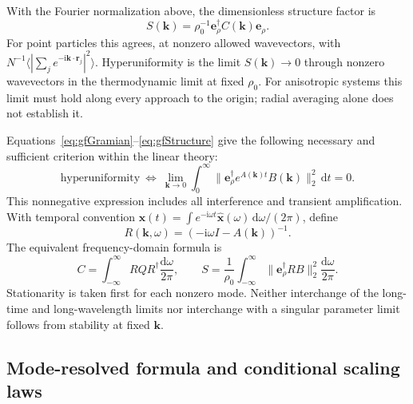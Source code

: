 \documentclass{article}
\begin{document}
With the Fourier normalization above, the dimensionless structure factor is
\begin{equation}
    \boxed{S(\mathbf k)=\rho_0^{-1}\mathbf e_\rho^\dagger C(\mathbf k)\mathbf e_\rho.}
    \label{eq:gfStructure}
\end{equation}
For point particles this agrees, at nonzero allowed wavevectors, with $N^{-1}\langle|\sum_j e^{-\mathrm i\mathbf k\cdot\mathbf r_j}|^2\rangle$. Hyperuniformity is the limit $S(\mathbf k)\to0$ through nonzero wavevectors in the thermodynamic limit at fixed $\rho_0$. For anisotropic systems this limit must hold along every approach to the origin; radial averaging alone does not establish it.

Equations~\eqref{eq:gfGramian}--\eqref{eq:gfStructure} give the following necessary and sufficient criterion within the linear theory:
\begin{equation}
    \boxed{\text{hyperuniformity}\ \Longleftrightarrow\
    \lim_{\mathbf k\to0}\int_0^\infty
    \|\mathbf e_\rho^\dagger e^{A(\mathbf k)t}B(\mathbf k)\|_2^2\,\mathrm dt=0.}
    \label{eq:gfExactHU}
\end{equation}
This nonnegative expression includes all interference and transient amplification. With temporal convention $\mathbf x(t)=\int e^{-\mathrm i\omega t}\widehat{\mathbf x}(\omega)\,\mathrm d\omega/(2\pi)$, define
\begin{equation}
    R(\mathbf k,\omega)=(-\mathrm i\omega I-A(\mathbf k))^{-1}.
\end{equation}
The equivalent frequency-domain formula is
\begin{equation}
    C=\int_{-\infty}^{\infty}RQR^\dagger\frac{\mathrm d\omega}{2\pi},
    \qquad S=\frac1{\rho_0}\int_{-\infty}^{\infty}
    \|\mathbf e_\rho^\dagger RB\|_2^2\frac{\mathrm d\omega}{2\pi}.
    \label{eq:gfResolvent}
\end{equation}
Stationarity is taken first for each nonzero mode. Neither interchange of the long-time and long-wavelength limits nor interchange with a singular parameter limit follows from stability at fixed $\mathbf k$.

\subsection{Mode-resolved formula and conditional scaling laws}
\end{document}
